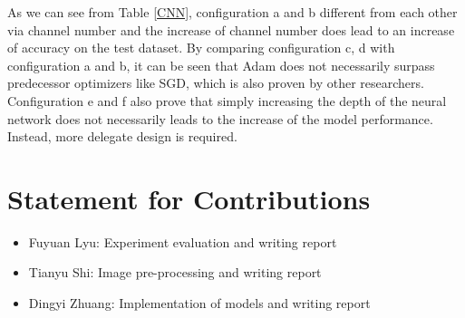 \documentclass[11pt]{scrartcl}
\begin{document}
As we can see from Table \ref{CNN}, configuration a and b different from each other via channel number and the increase of channel number does lead to an increase of accuracy on the test dataset. By comparing configuration c, d with configuration a and b, it can be seen that Adam does not necessarily surpass predecessor optimizers like SGD, which is also proven by other researchers\cite{reddi2019convergencee}. Configuration e and f also prove that simply increasing the depth of the neural network does not necessarily leads to the increase of the model performance. Instead, more delegate design is required. 


\section{Statement for Contributions}


\begin{itemize}
	\item Fuyuan Lyu: Experiment evaluation and writing report
	\item Tianyu Shi: Image pre-processing and writing report
	\item Dingyi Zhuang: Implementation of models and writing report
\end{itemize}



\end{document}
